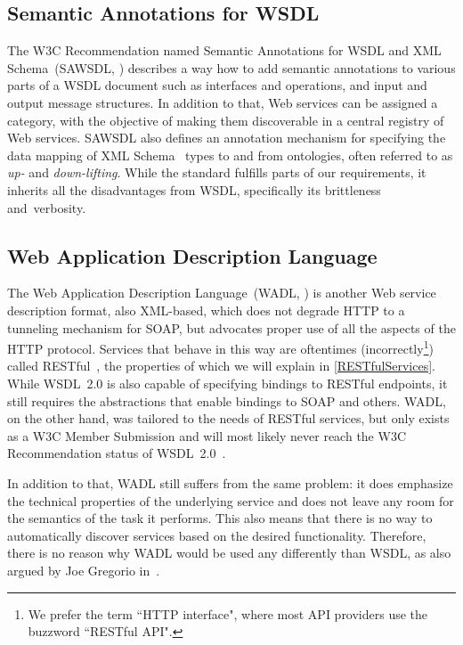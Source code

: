 \documentclass[runningheads,a4paper, twocolumn]{llncs}
\begin{document}
\subsection{Semantic Annotations for WSDL}
The W3C Recommendation named Semantic Annotations for WSDL and XML Schema~(SAWSDL, \cite{SAWSDL}) describes a way how to add semantic annotations to various parts of a WSDL document such as interfaces and operations, and input and output message structures. In addition to that, Web services can be assigned a category, with the objective of making them discoverable in a central registry of Web services. SAWSDL also defines an annotation mechanism for specifying the data mapping of XML Schema~\cite{xmlschema11-1, xmlschema11-2} types to and from ontologies, often referred to as \emph{up-} and \emph{down-lifting}. While the standard fulfills parts of our requirements, it inherits all the disadvantages from WSDL, specifically its brittleness and~verbosity.

\subsection{Web Application Description Language}
The Web Application Description Language~(WADL, \cite{WADL}) is another Web service description format, also XML-based, which does not degrade HTTP to a tunneling mechanism for SOAP, but advocates proper use of all the aspects of the HTTP protocol. Services that behave in this way are oftentimes (incorrectly\footnote{We prefer the term ``HTTP interface", where most API providers use the buzzword ``RESTful API".}) called RESTful~\cite{FieldingREST}, the properties of which we will explain in \autoref{RESTfulServices}. While WSDL~2.0 is also capable of specifying bindings to RESTful endpoints, it still requires the abstractions that enable bindings to SOAP and others. WADL, on the other hand, was tailored to the needs of RESTful services, but only exists as a W3C Member Submission and will most likely never reach the W3C Recommendation status of WSDL~2.0~\cite{WADLTeamComment}.

In addition to that, WADL still suffers from the same problem: it does emphasize the technical properties of the underlying service and does not leave any room for the semantics of the task it performs. This also means that there is no way to automatically discover services based on the desired functionality. Therefore, there is no reason why WADL would be used any differently than WSDL, as also argued by Joe Gregorio in~\cite{GregorioWADL}.
\end{document}
